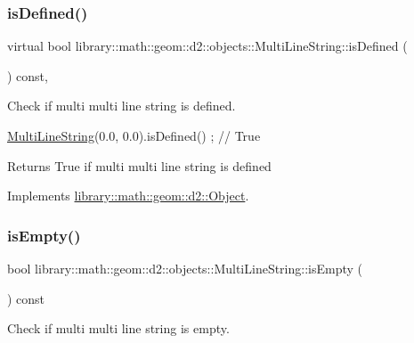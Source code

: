 \subsubsection{\texorpdfstring{is\+Defined()}{isDefined()}}
{\footnotesize\ttfamily virtual bool library\+::math\+::geom\+::d2\+::objects\+::\+Multi\+Line\+String\+::is\+Defined (\begin{DoxyParamCaption}{ }\end{DoxyParamCaption}) const\hspace{0.3cm}{\ttfamily [override]}, {\ttfamily [virtual]}}



Check if multi multi line string is defined. 


\begin{DoxyCode}
\hyperlink{classlibrary_1_1math_1_1geom_1_1d2_1_1objects_1_1_multi_line_string_a8fd6c575f0489484f99c94c607631303}{MultiLineString}(0.0, 0.0).isDefined() ; \textcolor{comment}{// True}
\end{DoxyCode}


\begin{DoxyReturn}{Returns}
True if multi multi line string is defined 
\end{DoxyReturn}


Implements \hyperlink{classlibrary_1_1math_1_1geom_1_1d2_1_1_object_ae9506254971168a3ca63e1923556b70d}{library\+::math\+::geom\+::d2\+::\+Object}.

\mbox{\label{classlibrary_1_1math_1_1geom_1_1d2_1_1objects_1_1_multi_line_string_a41b9e07b94cdbe7c2cc9fc49ce8f2d10}} 
\subsubsection{\texorpdfstring{is\+Empty()}{isEmpty()}}
{\footnotesize\ttfamily bool library\+::math\+::geom\+::d2\+::objects\+::\+Multi\+Line\+String\+::is\+Empty (\begin{DoxyParamCaption}{ }\end{DoxyParamCaption}) const}



Check if multi multi line string is empty. 


